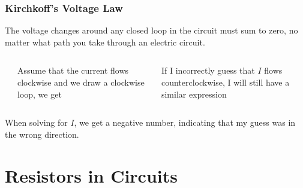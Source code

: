 \documentclass[12pt,aspectratio=169]{beamer}
\newcommand{\eq}[2]{\vspace{#1}{\Large\begin{displaymath}#2\end{displaymath}}}
\begin{document}
\begin{frame}
  \frametitle{Kirchkoff's Voltage Law}

  The voltage changes around any closed loop in the circuit must sum to zero,
  no matter what path you take through an electric circuit.

  \vspace{.1in}
  \begin{columns}
    \begin{center}
    \end{center}
    Assume that the current flows clockwise and we draw a clockwise loop, we
    get

    \eq{-.45in}{ V-V_R=0\;\;\rightarrow\;\; V-IR=0}

    \vspace{-.25in}If I incorrectly guess that $I$ flows counterclockwise, I
    will still have a similar expression

    \eq{-.45in}{-V_R-V=0\;\;\rightarrow\;\; -V-IR=0}
  \end{columns}

  \vspace{-.1in}When solving for $I$, we get a negative number, indicating
  that my guess was in the wrong direction.
\end{frame}


\section{Resistors in Circuits}
\end{document}
